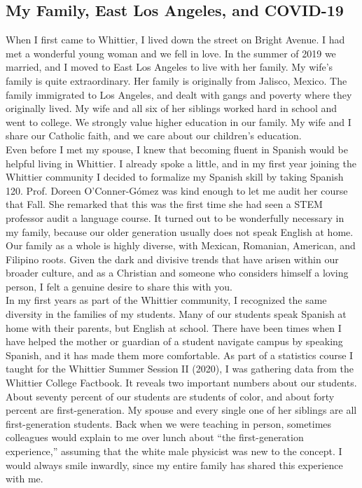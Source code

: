 \documentclass[../../main.tex]{subfiles}
\begin{document}
\subsection{My Family, East Los Angeles, and COVID-19}
\label{sec:family}

When I first came to Whittier, I lived down the street on Bright Avenue.  I had met a wonderful young woman and we fell in love.  In the summer of 2019 we married, and I moved to East Los Angeles to live with her family.  My wife's family is quite extraordinary.  Her family is originally from Jalisco, Mexico.  The family immigrated to Los Angeles, and dealt with gangs and poverty where they originally lived.  My wife and all six of her siblings worked hard in school and went to college.  We strongly value higher education in our family.  My wife and I share our Catholic faith, and we care about our children's education.
\\
\vspace{0.25cm}
Even before I met my spouse, I knew that becoming fluent in Spanish would be helpful living in Whittier.  I already spoke a little, and in my first year joining the Whittier community I decided to formalize my Spanish skill by taking Spanish 120. Prof. Doreen O'Conner-G\'{o}mez was kind enough to let me audit her course that Fall.  She remarked that this was the first time she had seen a STEM professor audit a language course.  It turned out to be wonderfully necessary in my family, because our older generation usually does not speak English at home.  Our family as a whole is highly diverse, with Mexican, Romanian, American, and Filipino roots.  Given the dark and divisive trends that have arisen within our broader culture, and as a Christian and someone who considers himself a loving person, I felt a genuine desire to share this with you.
\\
\vspace{0.25cm}
In my first years as part of the Whittier community, I recognized the same diversity in the families of my students.  Many of our students speak Spanish at home with their parents, but English at school.  There have been times when I have helped the mother or guardian of a student navigate campus by speaking Spanish, and it has made them more comfortable.  As part of a statistics course I taught for the Whittier Summer Session II (2020), I was gathering data from the Whittier College Factbook.  It reveals two important numbers about our students.  About seventy percent of our students are students of color, and about forty percent are first-generation.  My spouse and every single one of her siblings are all first-generation students.  Back when we were teaching in person, sometimes colleagues would explain to me over lunch about ``the first-generation experience,'' assuming that the white male physicist was new to the concept.  I would always smile inwardly, since my entire family has shared this experience with me.
\end{document}
